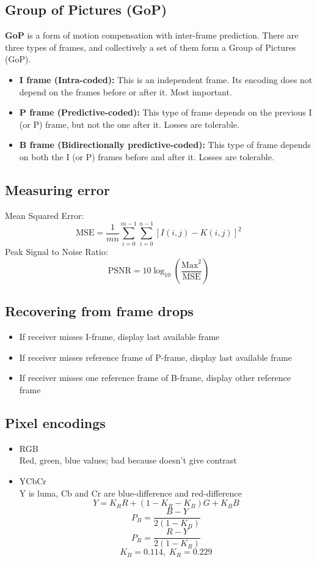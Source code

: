 \documentclass{article}
\begin{document}
\subsection{Group of Pictures (GoP)}
\textbf{GoP} is a form of motion compensation with inter-frame prediction. There are three types of frames, and collectively a set of them form a Group of Pictures (GoP).
\begin{itemize}
\item \textbf{I frame (Intra-coded):} This is an independent frame. Its encoding does not depend on the frames before or after it. Most important.
\item \textbf{P frame (Predictive-coded):} This type of frame depends on the previous I (or P) frame, but not the one after it. Losses are tolerable.
\item \textbf{B frame (Bidirectionally predictive-coded):} This type of frame depends on both the I (or P) frames before and after it. Losses are tolerable.
\end{itemize}

\subsection{Measuring error}

Mean Squared Error:
$$ \text{MSE} = \frac{1}{mn} \sum_{i=0}^{m-1} \sum_{i=0}^{n-1} [I(i,j) - K(i,j)]^2 $$
Peak Signal to Noise Ratio:
$$ \text{PSNR} = 10 \log_{10} \left( \frac{\text{Max}^2}{\text{MSE}} \right) $$

\subsection{Recovering from frame drops}

\begin{itemize}
\item If receiver misses I-frame, display last available frame
\item If receiver misses reference frame of P-frame, display last available frame
\item If receiver misses one reference frame of B-frame, display other reference frame
\end{itemize}

\subsection{Pixel encodings}

\begin{itemize}
\item RGB \\
Red, green, blue values; bad because doesn't give contrast
\item YCbCr \\
Y is luma, Cb and Cr are blue-difference and red-difference
$$ Y = K_RR + (1-K_R-K_B)G + K_BB $$
$$ P_B = \frac{B-Y}{2(1-K_B)} $$
$$ P_R = \frac{R-Y}{2(1-K_R)} $$
$$ K_B = 0.114, \; K_R = 0.229 $$
\end{itemize}
\end{document}
